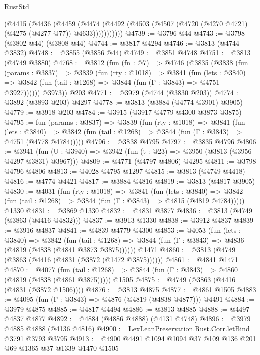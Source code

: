 \begin{lexlean}{RustStd}
\begin{coremodule}
          (@4415
            (@4436
              (@4459
                (@4474
                  (@4492 (@4503 (@4507 (@4720 (@4270 @4721) (@4275 (@4277 @77)) @4633)))))))))))
@4739 := @3796 @44
@4743 := @3798 (@3802 @44) (@3808 @44)
@4744 := @3817 @4294
@4746 := @3813 (@4744 @3832)
@4748 := @3855 (@3856 @44)
@4749 := @3851 @4748
@4751 := @3813 (@4749 @3880)
@4768 := @3812
    (fun (fn : @7) =>
    @4746
      (@3835
        (@3838
          (fun (params : @3837) =>
          @3839
            (fun (rty : @1018) =>
            @3841
              (fun (lets : @3840) =>
              @3842 (fun (tail : @1268) => @3844 (fun (Γ : @3843) => @4751 @3927))))))
        @3973))
    @203
@4771 := @3979 (@4744 (@3830 @203))
@4774 := @3892 (@3893 @203) @4297
@4778 := @3813 (@3884 (@4774 @3901) @3905)
@4779 := @3918 @203
@4784 := @3915 (@3917 @4779 @4300 @3873 @3875)
@4795 := fun (params : @3837) =>
  @3839
    (fun (rty : @1018) =>
    @3841
      (fun (lets : @3840) =>
      @3842 (fun (tail : @1268) => @3844 (fun (Γ : @3843) => @4751 (@4778 @4784)))))
@4796 := @3838 @4795
@4797 := @3835 @4796
@4806 := @3941 (fun (U : @3940) => @3942 (fun (t : @23) => @3950 (@3813 (@3956 @4297 @3831) @3967)))
@4809 := @4771 (@4797 @4806) @4295
@4811 := @3798 @4796 @4806
@4813 := @4028 @4795 @1297
@4815 := @3813 (@4749 @4418)
@4816 := @4774 @4421
@4817 := @3884 @4816
@4819 := @3813 (@4817 @3905)
@4830 := @4031
    (fun (rty : @1018) =>
    @3841
      (fun (lets : @3840) =>
      @3842 (fun (tail : @1268) => @3844 (fun (Γ : @3843) => @4815 (@4819 @4784)))))
    @1330
@4831 := @3869 @1330
@4832 := @4831 @3877
@4836 := @3813 (@4749 (@3863 (@4416 @4832)))
@4837 := @3913 @1330
@4838 := @3912 @4837
@4839 := @3916 @4837
@4841 := @4839 @4779 @4300
@4853 := @4053
    (fun (lets : @3840) =>
    @3842
      (fun (tail : @1268) => @3844 (fun (Γ : @3843) => @4836 (@4819 (@4838 (@4841 @3873 @3875))))))
    @1471
@4860 := @3813 (@4749 (@3863 (@4416 (@4831 (@3872 (@1472 @3875))))))
@4861 := @4841 @1471
@4870 := @4077
    (fun (tail : @1268) => @3844 (fun (Γ : @3843) => @4860 (@4819 (@4838 (@4861 @3875)))))
    @1505
@4875 := @4749 (@3863 (@4416 (@4831 (@3872 @1506))))
@4876 := @3813 @4875
@4877 := @4861 @1505
@4883 := @4095 (fun (Γ : @3843) => @4876 (@4819 (@4838 @4877))) @4491
@4884 := @3979 @4875
@4885 := @4817 @4494
@4886 := @3813 @4885
@4888 := @4497 @4837 @4877
@4892 := @4884 (@4886 @4888) (@4131 @4748)
@4896 := @3979 @4885 @4888 (@4136 @4816)
@4900 := LexLeanPreservation.Rust.Corr.letBind @3791 @3793 @3795
@4913 := @4900 @4491 @1094 @1094 @37 @109 @136 @201 @69 @1365 @37 @1339 @1470 @1505

\end{coremodule}
\end{lexlean}
